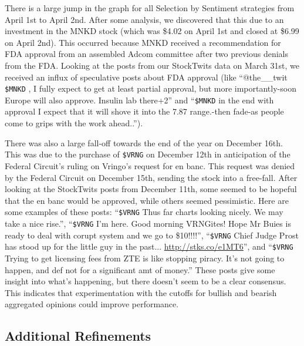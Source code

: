 There is a large jump in the graph for all Selection by Sentiment strategies from April 1st to April 2nd.
After some analysis, we discovered that this due to an investment in the MNKD stock (which was \$4.02 on April 1st and closed at \$6.99 on April 2nd).
This occurred because MNKD received a recommendation for FDA approval from an assembled Adcom committee after two previous denials from the FDA.
Looking at the posts from our StockTwits data on March 31st, we received an influx of speculative posts about FDA approval (like ``@the\_\_twit \texttt{\$MNKD} , I fully expect to get at least partial approval, but more importantly-soon Europe will also approve. Insulin lab there+2'' and ``\texttt{\$MNKD} in the end with approval I expect that it will shove it into the 7.87 range.-then fade-as people come to grips with the work ahead..'').

There was also a large fall-off towards the end of the year on December 16th.
This was due to the purchase of \texttt{\$VRNG} on December 12th in anticipation of the Federal Circuit’s ruling on Vringo’s request for en banc.
This request was denied by the Federal Circuit on December 15th, sending the stock into a free-fall.
After looking at the StockTwits posts from December 11th, some seemed to be hopeful that the en banc would be approved, while others seemed pessimistic.
Here are some examples of these posts: ``\texttt{\$VRNG} Thus far charts looking nicely. We may take a nice rise.'', ``\texttt{\$VRNG} I’m here. Good morning VRNGites! Hope Mr Buies is ready to deal with corupt system and we go to \$10!!!!'', ``\texttt{\$VRNG} Chief Judge Prost has stood up for the little guy in the past...  \url{http://stks.co/e1MT6}'', and ``\texttt{\$VRNG} Trying to get licensing fees from ZTE is like stopping piracy. It’s not going to happen, and def not for a significant amt of money.''
These posts give some insight into what’s happening, but there doesn’t seem to be a clear consensus.
This indicates that experimentation with the cutoffs for bullish and bearish aggregated opinions could improve performance.

\subsection{Additional Refinements}

